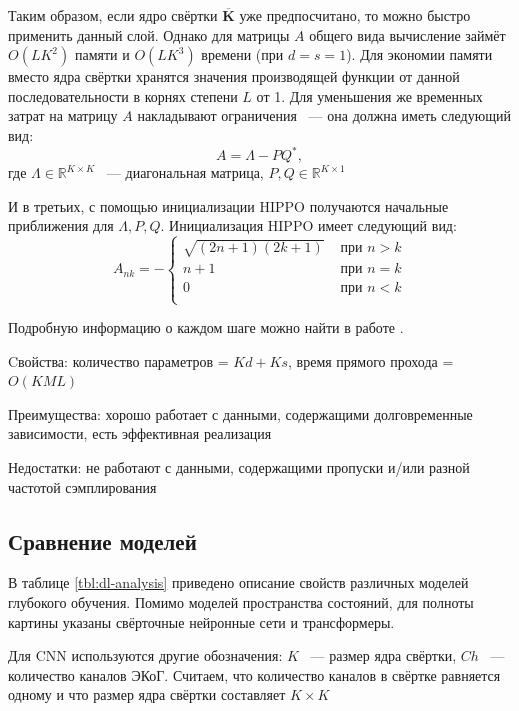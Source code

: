 \documentclass[a4paper, 12pt]{article}
\newcommand{\dR}{\mathds{R}}
\begin{document}
	Таким образом, если ядро свёртки $\overline{\mathbf{K}}$ уже предпосчитано, то можно быстро применить данный слой.
	Однако для матрицы $A$ общего вида вычисление займёт $O(LK^2)$ памяти и $O(LK^3)$ времени (при $d=s=1$).
	Для экономии памяти вместо ядра свёртки хранятся значения производящей функции от данной последовательности в корнях степени $L$ от 1.
	Для уменьшения же временных затрат на матрицу $A$ накладывают ограничения ~--- она должна иметь следующий вид:
	$$ A = \Lambda - PQ^*,$$
	где $\Lambda \in \dR^{K \times K}$ ~--- диагональная матрица, $P, Q \in \dR^{K \times 1}$
	
	И в третьих, с помощью инициализации HIPPO получаются начальные приближения для $\Lambda, P, Q$.
	Инициализация HIPPO имеет следующий вид:
	\begin{equation*}
		A_{nk} = -
		\begin{cases}
			\sqrt{(2n+1)(2k+1)} &\text{ при } n > k \\
			n+1 &\text{ при } n = k \\
			0 &\text{ при } n < k \\
		\end{cases}
	\end{equation*}

	
	Подробную информацию о каждом шаге можно найти в работе \citep{s4}.
	
	Cвойства: количество параметров = $Kd + Ks$, время прямого прохода = $O(KML)$

	Преимущества: хорошо работает с данными, содержащими долговременные зависимости, есть эффективная реализация \citep{s4-git}
	
	Недостатки: не работают с данными, содержащими пропуски и/или разной частотой сэмплирования
		
	\subsection{Сравнение моделей}
	В таблице \ref{tbl:dl-analysis} приведено описание свойств различных моделей глубокого обучения. Помимо моделей пространства состояний, для полноты картины указаны свёрточные нейронные сети и трансформеры.
	
	Для CNN используются другие обозначения: $K$ ~--- размер ядра свёртки, $Ch$ ~--- количество каналов ЭКоГ. Считаем, что количество каналов в свёртке равняется одному и что размер ядра свёртки составляет $K \times K$
	
\end{document}
